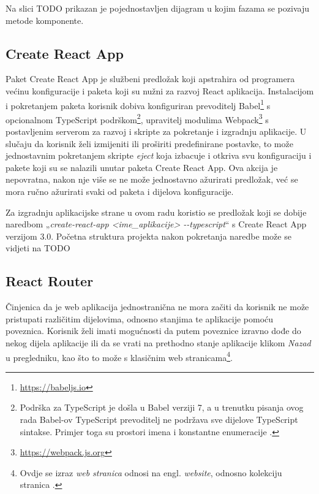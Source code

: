 \documentclass[times, utf8, diplomski, numeric]{fer}
\newcommand{\razmakp}{\vspace{18pt}}
\begin{document}
Na slici TODO prikazan je pojednostavljen dijagram u kojim fazama se pozivaju metode komponente.


\subsection{Create React App}

Paket Create React App je službeni predložak koji apstrahira od programera većinu konfiguracije i paketa koji su nužni za razvoj React aplikacija.
Instalacijom i pokretanjem paketa korisnik dobiva konfiguriran prevoditelj Babel\footnote{\url{https://babeljs.io}} s opcionalnom TypeScript podrškom\footnote{
    Podrška za TypeScript je došla u Babel verziji 7, a u trenutku pisanja ovog rada Babel-ov TypeScript prevoditelj ne podržava sve dijelove TypeScript sintakse. Primjer toga su prostori imena  i konstantne enumeracije \citep{ms_dev_babel}.
}, upravitelj modulima Webpack\footnote{\url{https://webpack.js.org}} s postavljenim serverom za razvoj i skripte za pokretanje i izgradnju aplikacije.
U slučaju da korisnik želi izmijeniti ili proširiti predefinirane postavke, to može jednostavnim pokretanjem skripte \emph{eject} koja izbacuje i otkriva svu konfiguraciju i pakete koji su se nalazili unutar paketa Create React App.
Ova akcija je nepovratna, nakon nje više se ne može jednostavno ažurirati predložak, već se mora ručno ažurirati svaki od paketa i dijelova konfiguracije\citep{gh_cra}.

\razmakp

Za izgradnju aplikacijske strane u ovom radu koristio se predložak koji se dobije naredbom „\emph{create-react-app <ime\_aplikacije> -{}-typescript}“ s Create React App verzijom 3.0.
Početna struktura projekta nakon pokretanja naredbe može se vidjeti na TODO


\subsection{React Router}

Činjenica da je web aplikacija jednostranična ne mora začiti da korisnik ne može pristupati različitim dijelovima, odnosno stanjima te aplikacije pomoću poveznica.
Korisnik želi imati mogućnosti da putem poveznice izravno dođe do nekog dijela aplikacije ili da se vrati na prethodno stanje aplikacije klikom \emph{Nazad} u pregledniku, kao što to može s klasičnim web stranicama\footnote{Ovdje se izraz \emph{web stranica} odnosi na engl. \emph{website}, odnosno kolekciju stranica .}.
\end{document}
